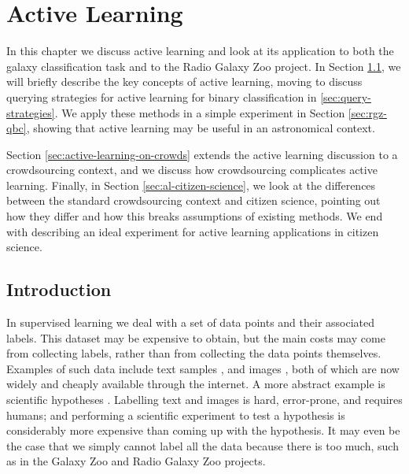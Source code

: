 
\chapter{Active Learning}
\label{cha:active-learning}

In this chapter we discuss active learning and look at its application to both
the galaxy classification task and to the Radio Galaxy Zoo project. In Section
\ref{sec:intro-active-learning}, we will briefly describe the key concepts of
active learning, moving to discuss querying strategies for active learning for
binary classification in \ref{sec:query-strategies}. We apply these methods in a
simple experiment in Section \ref{sec:rgz-qbc}, showing that active learning may
be useful in an astronomical context.

Section \ref{sec:active-learning-on-crowds} extends the active learning
discussion to a crowdsourcing context, and we discuss how crowdsourcing
complicates active learning. Finally, in Section \ref{sec:al-citizen-science},
we look at the differences between the standard crowdsourcing context and
citizen science, pointing out how they differ and how this breaks assumptions of
existing methods. We end with describing an ideal experiment for active learning
applications in citizen science.

\section{Introduction}
\label{sec:intro-active-learning}
    
    In supervised learning we deal with a set of data points and their
    associated labels. This dataset may be expensive to obtain, but the main
    costs may come from collecting labels, rather than from collecting the data
    points themselves. Examples of such data include text samples
    \citep{lewis94, mccallum98}, and images \citep{loy11, lintott08}, both of
    which are now widely and cheaply available through the internet. A more
    abstract example is scientific hypotheses \citep{king04}. Labelling text and
    images is hard, error-prone, and requires humans; and performing a
    scientific experiment to test a hypothesis is considerably more expensive
    than coming up with the hypothesis. It may even be the case that we simply
    cannot label all the data because there is too much, such as in the Galaxy
    Zoo \citep{lintott08} and Radio Galaxy Zoo \citep{banfield15} projects.

